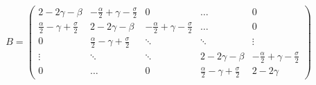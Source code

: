 \documentclass[11pt,a4paper]{article}
\begin{document}
\[
B = \begin{pmatrix}
      2-2\gamma - \beta & -\frac{\alpha}{2} + \gamma -\frac{\sigma}{2} & 0   & \dots     & 0   \\
      \frac{\alpha}{2} -  \gamma + \frac{\sigma}{2} & 2-2\gamma - \beta       & -\frac{\alpha}{2} + \gamma -\frac{\sigma}{2}  & \dots     & 0 \\
      0&         \frac{\alpha}{2} -  \gamma + \frac{\sigma}{2}& \ddots         & \ddots    & \vdots    \\
      \vdots&         \ddots&           \ddots &     2-2\gamma - \beta      & -\frac{\alpha}{2} + \gamma -\frac{\sigma}{2} \\
      0&         \dots&           0&          \frac{\alpha}{2} -  \gamma + \frac{\sigma}{2} & 2-2\gamma
  \end{pmatrix}
\]
\end{document}
